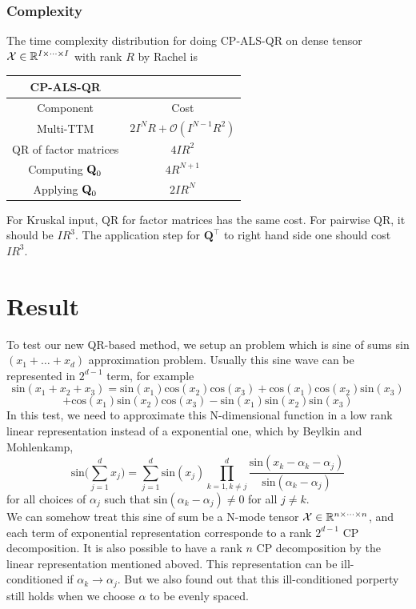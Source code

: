 \documentclass{article}
\newcommand{\mat}[1]{\mathbf{#1}}
\newcommand{\M}[2][]{\bm{#1{\mathbf{\MakeUppercase{#2}}}}} 		%
\newcommand{\T}[2][]{#1{\mathbf{\cal{#2}}}} 						%
\begin{document}
\subsubsection{Complexity}
The time complexity distribution for doing CP-ALS-QR on dense tensor $\T{X} \in \mathbb{R}^{I \times \dots \times I}$ with rank $R$ by Rachel is 
\begin{table}[!ht]
  \centering
  \begin{tabular}{|c|c|}
    \hline
    {\textbf{CP-ALS-QR}} & \\
    \hline
    Component & Cost \\
    \hline
    Multi-TTM & $2I^N R + \mathcal{O}(I^{N-1} R^2)$\\
    QR of factor matrices & $4IR^2$\\
     Computing $\M{Q}_0$ & $4R^{N+1}$\\
     Applying $\M{Q}_0$& $2IR^N$\\
     \hline
  \end{tabular}
  \end{table}
  For Kruskal input, QR for factor matrices has the same cost. For pairwise QR, it should be $IR^3$. The application step
  for $\mat{Q}^\top$ to right hand side one should cost $IR^3$.
  




\section{Result}
To test our new QR-based method, we setup an problem which is sine of sums sin$(x_1+\dots+ x_d)$ approximation problem.
Usually this sine wave can be represented in $2^{d-1}$ term, for example
$$\text{sin}(x_1+x_2+x_3) = \text{sin}(x_1)\text{cos}(x_2)\text{cos}(x_3)+\text{cos}(x_1)\text{cos}(x_2)\text{sin}(x_3)$$
$$+\text{cos}(x_1)\text{sin}(x_2)\text{cos}(x_3) - \text{sin}(x_1)\text{sin}(x_2)\text{sin}(x_3)$$
In this test, we need to approximate this N-dimensional function in a low rank linear representation instead of 
a exponential one, which by Beylkin and Mohlenkamp,
$$\text{sin}\bigl(\sum^d_{j=1}x_j\bigr) = \sum^d_{j=1}\text{sin}(x_j)\prod^d_{k=1,k\neq j}\frac{\text{sin}(x_k - \alpha_k -\alpha_j)}{\text{sin}(\alpha_k - \alpha_j)}$$
for all choices of  ${\alpha_j}$ such that $\text{sin}(\alpha_k - \alpha_j) \neq 0$ for all $j \neq k$.
\\
We can somehow treat this sine of sum be a N-mode tensor $\T{X} \in \mathbb{R}^{n \times \dots \times n}$, and each term of exponential representation
corresponde to a rank $2^{d-1}$ CP decomposition. It is also possible to have a rank $n$ CP decomposition by the linear
representation mentioned aboved. This representation can be ill-conditioned if $\alpha_k \rightarrow \alpha_j$.
But we also found out that this ill-conditioned porperty still holds when we choose $\alpha$ to be evenly spaced.\\
\end{document}
